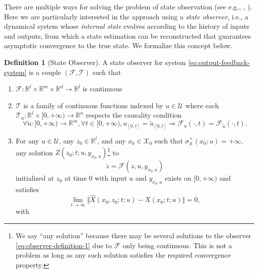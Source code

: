 \documentclass[
]{book}
\theoremstyle{definition}
\newtheorem{definition}{Definition}[chapter]
\theoremstyle{definition}
\theoremstyle{definition}
\theoremstyle{definition}
\theoremstyle{remark}
\begin{document}
There are multiple ways for solving the problem of state observation (see e.g., \citep{bernard19book-observer}, \citep{bernard22arc-observer}). Here we are particularly interested in the approach using a \emph{state observer}, i.e., a dynamical system whose \emph{internal state} evolves according to the history of inputs and outputs, from which a state estimation can be reconstructed that guarantees asymptotic convergence to the true state. We formalize this concept below.

\begin{definition}[State Observer]
\protect\hypertarget{def:stateobserver}{}\label{def:stateobserver}A state observer for system \eqref{eq:output-feedback-system} is a couple \((\mathcal{F},\mathcal{T})\) such that

\begin{enumerate}
\def\labelenumi{\arabic{enumi}.}
\item
  \(\mathcal{F}: \mathbb{R}^{l} \times \mathbb{R}^{m} \times \mathbb{R}^d \rightarrow \mathbb{R}^l\) is continuous
\item
  \(\mathcal{T}\) is a family of continuous functions indexed by \(u \in \mathcal{U}\) where each \(\mathcal{T}_u: \mathbb{R}^l \times [0,+\infty) \rightarrow \mathbb{R}^n\) respects the causality condition
  \[
  \forall \tilde{u}: [0,+\infty) \rightarrow \mathbb{R}^m,\forall t \in [0,+\infty), u_{[0,t]} = \tilde{u}_{[0,t]} \Rightarrow  \mathcal{F}_u (\cdot,t) = \mathcal{F}_{\tilde{u}}(\cdot,t).
  \]
\item
  For any \(u \in \mathcal{U}\), any \(z_0 \in \mathbb{R}^l\), and any \(x_0 \in \mathcal{X}_0\) such that \(\sigma^+_{\mathbb{X}}(x_0;u) = +\infty\), any solution \(Z(z_0;t;u,y_{x_0,u})\)\footnote{We say ``any solution'' because there may be several solutions to the observer \eqref{eq:observer-definition-1} due to \(\mathcal{F}\) only being continuous. This is not a problem as long as any such solution satisfies the required convergence property.} to
  \begin{equation}
  \dot{z} = \mathcal{F}(z,u,y_{x_0,u})
  \label{eq:observer-definition-1}
  \end{equation}
  initialized at \(z_0\) at time \(0\) with input \(u\) and \(y_{x_0,u}\) exists on \([0,+\infty)\) and satisfies
  \begin{equation}
  \lim_{t \rightarrow \infty} \Vert \hat{X}(x_0,z_0;t;u) - X(x_0;t;u) \Vert = 0,
  \label{eq:observer-definition-2}
  \end{equation}
  with
  \begin{equation}

\end{equation}
\end{enumerate}
\end{definition}
\end{document}
